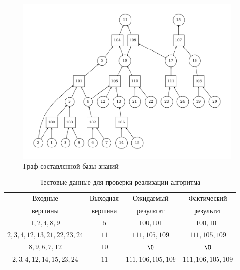 \begin{figure}[h!]
    \centering
    \includegraphics[width=\linewidth]{img/kb.pdf}
    \caption{Граф составленной базы знаний}
    \label{fig:graph0}
\end{figure}

\begin{table}[h!]
    \centering
    \caption{Тестовые данные для проверки реализации алгоритма}
    \begin{tabular}{|c|c|c|c|}
        \hline
        Входные & Выходная & Ожидаемый & Фактический \\
        вершины & вершина & результат & результат \\
        \hline
        \hline
        $1,2,4,8,9$ & $5$ & $100,101$ & $100,101$ \\
		$2,3,4,12,13,21,22,23,24$ & $11$ & $111,105,109$ & $111,105,109$ \\
		$8,9,6,7,12$ & $10$ & $\O$ & $\O$ \\
		$2,3,4,12,14,15,23,24$ & $11$ & $111,106,105,109$ & $111,106,105,109$ \\
        \hline
    \end{tabular}
\end{table}
